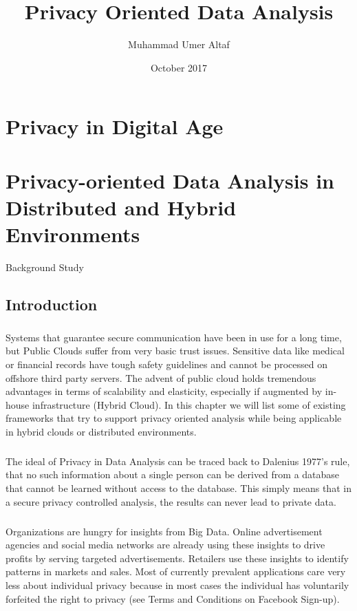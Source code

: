 \documentclass{report}
\title{Privacy Oriented Data Analysis}
\author{Muhammad Umer Altaf }
\date{October 2017}
\begin{document}
\maketitle
\setcounter{tocdepth}{1}
\tableofcontents

\chapter{Privacy in Digital Age}






\chapter{Privacy-oriented Data Analysis in Distributed and Hybrid Environments}{Background Study}
\section{Introduction}
\paragraph{}
Systems that guarantee secure communication have been in use for a long time, but Public Clouds suffer from very basic trust issues. Sensitive data like medical or financial records have tough safety guidelines and cannot be processed on offshore third party servers. The advent of public cloud holds tremendous advantages in terms of scalability and elasticity, especially if augmented by in-house infrastructure (Hybrid Cloud). In this chapter we will list some of existing frameworks that try to support privacy oriented analysis while being applicable in hybrid clouds or distributed environments.
\paragraph{}
The ideal of Privacy in Data Analysis can be traced back to Dalenius 1977’s \cite{dalenius1977} rule, that no such information about a single person can be derived from a database that cannot be learned without access to the database. This simply means that in a secure privacy controlled analysis, the results can never lead to private data.
\paragraph{}
Organizations are hungry for insights from Big Data. Online advertisement agencies and social media networks are already using these insights to drive profits by serving targeted advertisements. Retailers use these insights to identify patterns in markets and sales. Most of currently prevalent applications care very less about individual privacy because in most cases the individual has voluntarily forfeited the right to privacy (see Terms and Conditions on Facebook Sign-up).
\end{document}
